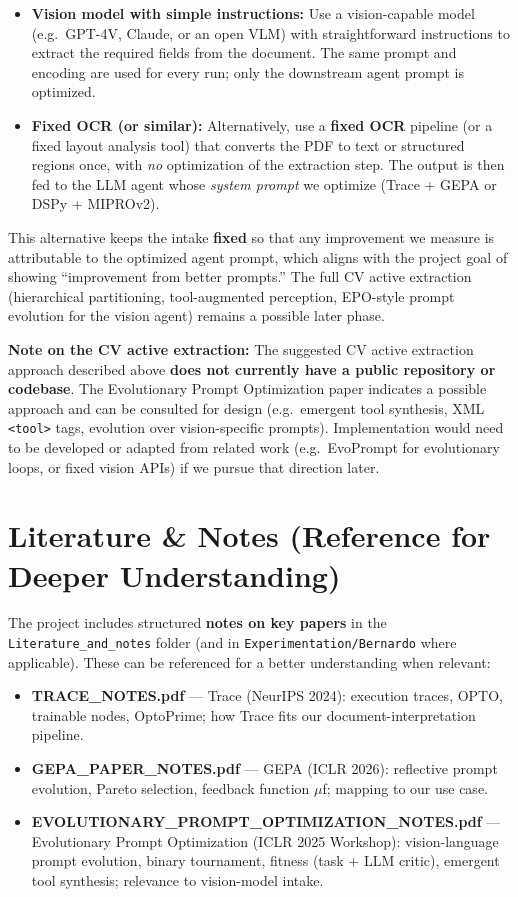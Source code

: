 \documentclass[11pt,a4paper]{article}
\begin{document}
\begin{itemize}
  \item \textbf{Vision model with simple instructions:} Use a vision-capable model (e.g.\ GPT-4V, Claude, or an open VLM) with straightforward instructions to extract the required fields from the document. The same prompt and encoding are used for every run; only the downstream agent prompt is optimized.
  \item \textbf{Fixed OCR (or similar):} Alternatively, use a \textbf{fixed OCR} pipeline (or a fixed layout analysis tool) that converts the PDF to text or structured regions once, with \emph{no} optimization of the extraction step. The output is then fed to the LLM agent whose \emph{system prompt} we optimize (Trace + GEPA or DSPy + MIPROv2).
\end{itemize}

This alternative keeps the intake \textbf{fixed} so that any improvement we measure is attributable to the optimized agent prompt, which aligns with the project goal of showing ``improvement from better prompts.'' The full CV active extraction (hierarchical partitioning, tool-augmented perception, EPO-style prompt evolution for the vision agent) remains a possible later phase.

\textbf{Note on the CV active extraction:} The suggested CV active extraction approach described above \textbf{does not currently have a public repository or codebase}. The Evolutionary Prompt Optimization paper indicates a possible approach and can be consulted for design (e.g.\ emergent tool synthesis, XML \texttt{<tool>} tags, evolution over vision-specific prompts). Implementation would need to be developed or adapted from related work (e.g.\ EvoPrompt for evolutionary loops, or fixed vision APIs) if we pursue that direction later.

\section{Literature \& Notes (Reference for Deeper Understanding)}

The project includes structured \textbf{notes on key papers} in the \texttt{Literature\_and\_notes} folder (and in \texttt{Experimentation/Bernardo} where applicable). These can be referenced for a better understanding when relevant:

\begin{itemize}
  \item \textbf{TRACE\_NOTES.pdf} --- Trace (NeurIPS 2024): execution traces, OPTO, trainable nodes, OptoPrime; how Trace fits our document-interpretation pipeline.
  \item \textbf{GEPA\_PAPER\_NOTES.pdf} --- GEPA (ICLR 2026): reflective prompt evolution, Pareto selection, feedback function $\mu$f; mapping to our use case.
  \item \textbf{EVOLUTIONARY\_PROMPT\_OPTIMIZATION\_NOTES.pdf} --- Evolutionary Prompt Optimization (ICLR 2025 Workshop): vision-language prompt evolution, binary tournament, fitness (task + LLM critic), emergent tool synthesis; relevance to vision-model intake.
\end{itemize}
\end{document}
